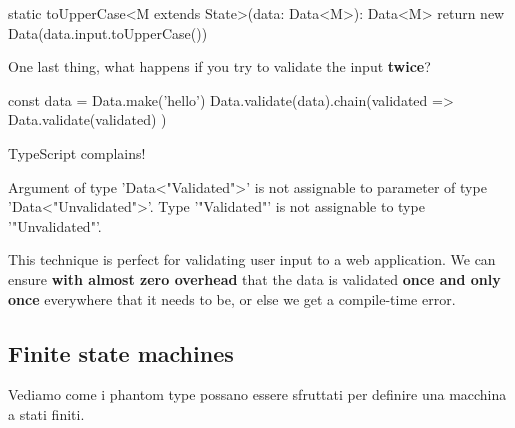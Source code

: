 \documentclass[12pt]{article}
\theoremstyle{definition}
\newenvironment{code}
  {\vspace{0.5cm} \VerbatimEnvironment\begin{typescriptcode}}
  {\end{typescriptcode} \vspace{0.2cm}}
\begin{document}
\begin{code}
static toUpperCase<M extends State>(data: Data<M>): Data<M> {
  return new Data(data.input.toUpperCase())
}
\end{code}

One last thing, what happens if you try to validate the input \textbf{twice}?

\begin{code}
const data = Data.make('hello')
Data.validate(data).chain(validated =>
  Data.validate(validated)
)
\end{code}

TypeScript complains!

\begin{code}
[ts]
Argument of type 'Data<"Validated">' is not assignable
  to parameter of type 'Data<"Unvalidated">'.
  Type '"Validated"' is not assignable to type '"Unvalidated"'.
\end{code}

This technique is perfect for validating user input to a web application.
We can ensure \textbf{with almost zero overhead} that the data is validated \textbf{once and only once} everywhere that it needs to be,
or else we get a compile-time error.

\subsection{Finite state machines}

Vediamo come i phantom type possano essere sfruttati per definire una macchina a stati finiti.
\end{document}
